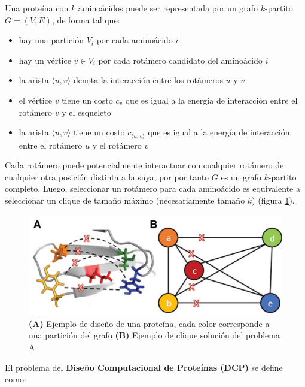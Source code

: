 \documentclass[letterpaper, 12pt]{report}
\begin{document}
 
Una proteína con $k$ aminoácidos puede ser representada por un grafo $k$-partito $G = (V,E)$, de forma tal que:
\begin{itemize}
    \item hay una partición $V_i$ por cada aminoácido $i$
    \item hay un vértice $v \in V_i$ por cada rotámero candidato del aminoácido $i$
    \item la arista $\langle u,v \rangle$ denota la interacción entre los rotámeros $u$ y $v$
    \item el vértice $v$ tiene un costo $c_v$ que es igual a la energía de interacción entre el rotámero $v$ y el esqueleto
    \item la arista $\langle u,v \rangle$ tiene un costo $c_{ \langle u,v \rangle }$ que es igual a la energía de interacción entre el rotámero $u$ y el rotámero $v$ \\
\end{itemize}

Cada rotámero puede potencialmente interactuar con cualquier rotámero de cualquier otra posición distinta a la suya, por
por tanto  $G$ es un grafo $k$-partito completo. Luego, seleccionar un rotámero para cada aminoácido es equivalente a seleccionar
un clique de tamaño máximo (necesariamente tamaño $k$) (figura \ref{fig4}). \\

\begin{figure}[h!]
    \begin{center}
        \includegraphics[scale=0.7]{images/solution.png}
    \end{center}    
    \caption{\textbf{(A)} Ejemplo de diseño de una proteína, cada color corresponde a una partición del grafo \textbf{(B)} Ejemplo de clique solución del problema A}
    \label{fig4}
\end{figure} 

El problema del \textbf{Dise\~no Computacional de Proteínas (DCP)} se define como:
\end{document}
